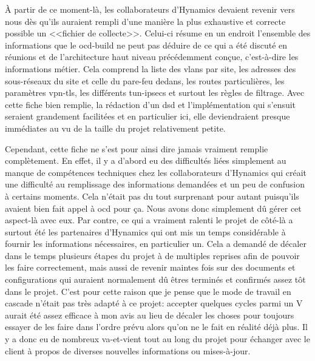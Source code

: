 \documentclass[12pt, oneside, a4paper, titlepage]{report}
\begin{document}
À partir de ce moment-là, les collaborateurs d'Hynamics devaient revenir vers
nous dès qu'ils auraient rempli d'une manière la plus exhaustive et correcte
possible un <<fichier de collecte>>. Celui-ci résume en un endroit l'ensemble
des informations que le \gls{ocd-build} ne peut pas déduire de ce qui a été
discuté en réunions et de l'architecture haut niveau précédemment conçue,
c'est-à-dire les informations métier. Cela comprend la liste des \glspl{vlan}
par site, les adresses des sous-réseaux du site et celle du pare-feu dedans, les
routes particulières, les paramètres \gls{vpn-tls}, les différents
\glspl{tun-ipsec} et surtout les règles de filtrage. Avec cette fiche bien
remplie, la rédaction d'un \gls{dsd} et l'implémentation qui s'ensuit seraient
grandement facilitées et en particulier ici, elle deviendraient presque
immédiates au vu de la taille du projet relativement petite.

Cependant, cette fiche ne s'est pour ainsi dire jamais vraiment remplie
complètement. En effet, il y a d'abord eu des difficultés liées simplement au
manque de compétences techniques chez les collaborateurs d'Hynamics qui créait
une difficulté au remplissage des informations demandées et un peu de confusion
à certains moments. Cela n'était pas du tout surprenant pour autant puisqu'ils
avaient bien fait appel à \gls{ocd} pour ça. Nous avons donc simplement dû gérer
cet aspect-là avec eux. Par contre, ce qui a vraiment ralenti le projet de
côté-là a surtout été les partenaires d'Hynamics qui ont mis un temps
considérable à fournir les informations nécessaires, en particulier un. Cela a
demandé de décaler dans le temps plusieurs étapes du projet à de multiples
reprises afin de pouvoir les faire correctement, mais aussi de revenir maintes
fois sur des documents et configurations qui auraient normalement dû êtres
terminés et confirmés assez tôt dans le projet. C'est pour cette raison que je
pense que le mode de travail en cascade n'était pas très adapté à ce projet:
accepter quelques cycles parmi un V aurait été assez efficace à mon avis au lieu
de décaler les choses pour toujours essayer de les faire dans l'ordre prévu
alors qu'on ne le fait en réalité déjà plus. Il y a donc eu de nombreux
va-et-vient tout au long du projet pour échanger avec le client à propos de
diverses nouvelles informations ou mises-à-jour.
\end{document}
